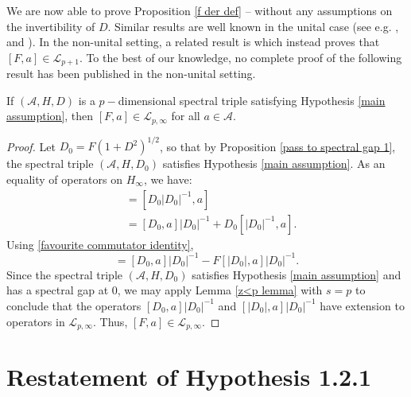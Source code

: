     We are now able to prove Proposition \ref{f der def} -- without any assumptions on the invertibility of $D.$ Similar results are well
    known in the unital case (see e.g. \cite[Lemma 1]{CPRS1}, \cite[Lemma 10.18]{GVF} and \cite[Lemma 5]{BF}). In the non-unital setting, a related result is \cite[Proposition 2.14]{CGRS2} which instead proves that $[F,a] \in \mathcal{L}_{p+1}$. To the best of our knowledge, no complete proof of the following result has been published in the non-unital setting.
    \begin{prop}\label{f der def}
        If $(\mathcal{A},H,D)$ is a $p-$dimensional spectral triple satisfying Hypothesis \ref{main assumption}, then $[F,a]\in\mathcal{L}_{p,\infty}$ for all $a\in\mathcal{A}.$
    \end{prop}
    \begin{proof} 
        Let $D_0 = F(1+D^2)^{1/2}$, so that by Proposition \ref{pass to spectral gap 1}, the spectral triple $(\mathcal{A},H,D_0)$ satisfies
        Hypothesis \ref{main assumption}. As an equality of operators on $H_\infty$, we have:
        \begin{align*}
            [F,a] &= [D_0|D_0|^{-1},a]\\
                  &= [D_0,a]|D_0|^{-1}+D_0[|D_0|^{-1},a].
        \end{align*}
        Using \eqref{favourite commutator identity},
        \begin{equation*}
            [F,a] = [D_0,a]|D_0|^{-1}-F[|D_0|,a]|D_0|^{-1}.
        \end{equation*}
        Since the spectral triple $(\mathcal{A},H,D_0)$ satisfies Hypothesis \ref{main assumption} and has a spectral gap at $0$,
        we may apply Lemma \ref{z<p lemma} with $s = p$ to conclude that the operators $[D_0,a]|D_0|^{-1}$ and $[|D_0|,a]|D_0|^{-1}$ have
        extension to operators in $\mathcal{L}_{p,\infty}$. Thus, $[F,a] \in \mathcal{L}_{p,\infty}$.
    \end{proof}

\section{Restatement of Hypothesis 1.2.1}\label{replacement section}

